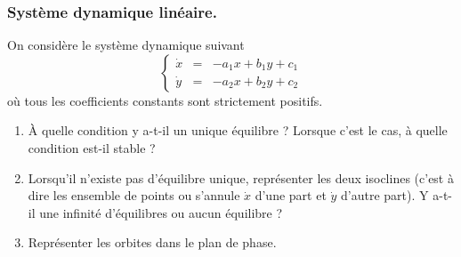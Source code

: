 \subsubsection{Système dynamique linéaire.} 

On considère le système dynamique suivant
$$
\left\{\begin{array}{rcl}
        \dot x & = & -a_1 x + b_1 y + c_1 \\ 
        \dot y & = & -a_2 x + b_2 y + c_2
        \end{array}\right.
$$
où tous les coefficients constants sont strictement positifs.
\begin{enumerate}
  \item À quelle condition y a-t-il un unique équilibre ? Lorsque c’est le cas, à quelle condition est-il stable ?
  \item Lorsqu’il n’existe pas d’équilibre unique, représenter les deux isoclines (c'est à dire les ensemble de points ou s'annule $\dot x$ d'une part et $\dot y$ d'autre part). Y a-t-il une infinité d’équilibres ou aucun équilibre ?
  \item Représenter les orbites dans le plan de phase.
\end{enumerate}

\solution{\todo{}}

